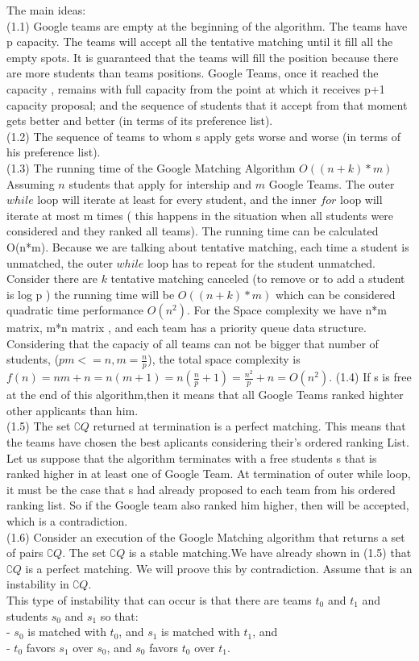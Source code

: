 \documentclass[10 pt]{article}
\begin{document}
The main ideas:\\
(1.1) Google teams are empty at the beginning of the algorithm. The teams have p capacity. The teams will accept all the tentative matching until it fill all the empty spots. It is guaranteed that the teams will fill the position because there are more students than teams positions. Google Teams, once it reached the capacity , remains with full capacity from the point at which it receives p+1 capacity proposal; and the sequence of students that it accept from that moment  gets better and better (in terms of its preference list).\\
(1.2) The sequence of teams to whom s apply gets worse and worse (in terms of his preference list).\\
(1.3) The running time of the Google Matching Algorithm $O((n+k )* m)$ 
Assuming $n$ students that apply for intership and $m$ Google Teams.
The outer $while$ loop will iterate at least for every student, and the inner $for$ loop will iterate at most m times ( this happens in the situation when all students were considered and they ranked all teams).
The running time can be calculated O(n*m).
Because we are talking about tentative matching, each time a student is unmatched, the outer $while$  loop has to repeat for the student unmatched. Consider there are $k$ tentative matching canceled (to remove or to add a student is log p ) the running time will be $O((n+k )* m)$  which can be considered quadratic time performance $O(n^2)$. For the Space complexity we have n*m matrix, m*n matrix , and each team has a priority queue data structure. Considering that the capaciy of all teams can not be bigger that number of students, ($pm <= n, m =  \frac{n}{p}$), the total space complexity is $f(n) = nm + n = n( m+1) =  n(\frac{n}{p} + 1) =  \frac{n^2}{p} + n = O(n^2). $  
(1.4) If s is free at the end of this algorithm,then it means that all Google Teams ranked highter other applicants than him.\\
(1.5) The set $\complement{Q} $ returned at termination is a perfect matching. This means that the teams have chosen the best aplicants considering their's ordered ranking List. Let us suppose that the algorithm terminates with a free students s that is ranked higher in at least one of Google Team. At termination of outer while loop, it must be the case that s had already proposed to each team from his ordered ranking list. So if the Google team also ranked him higher, then will be accepted, which is a contradiction.\\
(1.6) Consider an execution of the Google Matching  algorithm that returns a set of pairs  $\complement{Q} $. The set $\complement{Q} $ is a stable matching.We have already shown in (1.5)  that $\complement{Q} $  is a perfect matching. We will proove this by contradiction. Assume that is an instability in $\complement{Q} $.\\
This type of instability that can occur is that there are teams $t_0$ and $t_1$ and students $s_0$ and $s_1$ so that: \\
- $s_0$ is matched with $t_0$, and  $s_1$ is matched with $t_1$, and \\
- $t_0$ favors $s_1$ over $s_0$, and  $s_0$ favors $t_0$  over $t_1$. 
\end{document}
